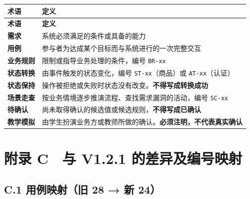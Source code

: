 \documentclass[12pt,a4paper]{ctexart}
\begin{document}
{\footnotesize
\begin{longtable}{|p{2.75cm}|p{13.25cm}|}
\hline
\textbf{术语} & \textbf{定义} \\
\hline
\endfirsthead
\hline
\textbf{术语} & \textbf{定义} \\
\hline
\endhead
\hline
\endfoot
\textbf{需求} & 系统必须满足的条件或具备的能力 \\
\hline
\textbf{用例} & 参与者为达成某个目标而与系统进行的一次完整交互 \\
\hline
\textbf{业务规则} & 限制或指导业务处理的条件，编号 \texttt{BR-xx} \\
\hline
\textbf{状态转换} & 由事件触发的状态变化，编号 \texttt{ST-xx}（商品）或 \texttt{AT-xx}（认证） \\
\hline
\textbf{状态保持} & 操作被拒绝或失败时状态没有改变。\textbf{不得写成转换成功} \\
\hline
\textbf{场景走查} & 按业务情境逐步推演流程、查找需求漏洞的活动，编号 \texttt{SC-xx} \\
\hline
\textbf{待确认} & 尚未取得确认的候选值或候选规则，\textbf{不得写成已确认} \\
\hline
\textbf{教学模拟} & 由学生扮演业务方或教师所做的确认。\textbf{必须注明，不代表真实确认} \\
\hline
\end{longtable}
}



\section*{附录 C　与 V1.2.1 的差异及编号映射}

\subsection*{C.1 用例映射（旧 28 → 新 24）}
\end{document}
